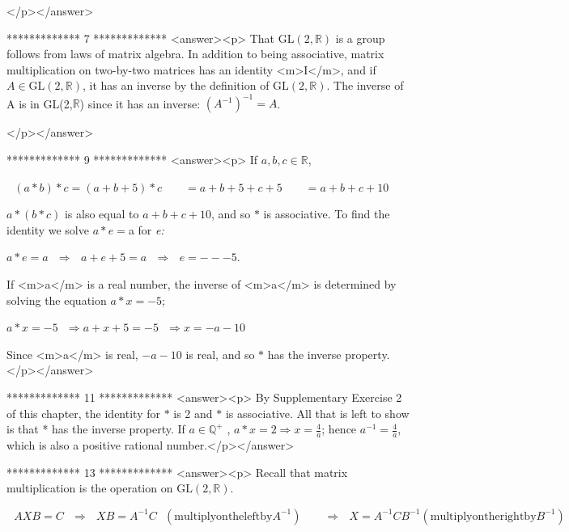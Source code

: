 </p></answer>


*************
7
*************
<answer><p>  That \(\text{GL}(2,\mathbb{R})\) is a group follows from laws of matrix algebra. In addition to being associative, matrix multiplication on
two-by-two matrices has an identity <m>I</m>, and if \(A \in  \text{GL} (2,\mathbb{R})\), it has an inverse by the definition of \(\text{GL} (2,\mathbb{R})\).
The inverse of A is in GL(2,$\mathbb{R}$) since it has an inverse: \(\left(A^{-1}\right)^{-1} = A\).

</p></answer>


*************
9
*************
<answer><p> If \(a, b, c \in  \mathbb{R}\),



 \(\text{          }(a * b) * c = (a + b + 5) * c\quad \quad =a+b+5+c+5\quad \quad =a+b+c+10\)



 \(a * (b * c)\) is also equal to \(a+b+c+10\), and so \(*\) is associative. To find the identity we solve \(a * e =\)a for \textit{ e:}



\(a * e = a\text{   }\Rightarrow \text{  }a + e + 5 = a\text{   }\Rightarrow \text{  }e = ---5\).



If <m>a</m> is a real number, the inverse of <m>a</m> is determined by solving the equation \(a * x=-5\);



\(a*x=-5\text{  }\Rightarrow  a + x + 5 = -5\text{  }\Rightarrow  x = -a-10\)



Since <m>a</m> is real, \(-a-10\) is real, and so \(*\) has the inverse property.</p></answer>


*************
11
*************
<answer><p> By Supplementary Exercise 2 of this chapter, the identity for \(*\) is 2 and \(*\) is associative. All that is left to show is that * has the
inverse property. If \(a \in  \mathbb{Q}^+\)  , \(a * x = 2 \Rightarrow  x = \frac{4}{a}\); hence  \(a^{-1}= \frac{4}{a}\), which is also a positive
rational number.</p></answer>


*************
13
*************
<answer><p> Recall that matrix multiplication is the operation on \(\text{GL}(2,\mathbb{R})\).



\(\text{        }A X B = C\text{  }\Rightarrow \text{  }X B = A^{-1}C\text{        }\left(\text{multiply} \text{on} \text{the} \text{left}
\text{by} A^{-1}\right)\quad \quad \Rightarrow \text{  }X = A^{-1}C B^{-1} \left(\text{multiply} \text{on} \text{the} \text{right} \text{by} B^{-1}\right)\)



